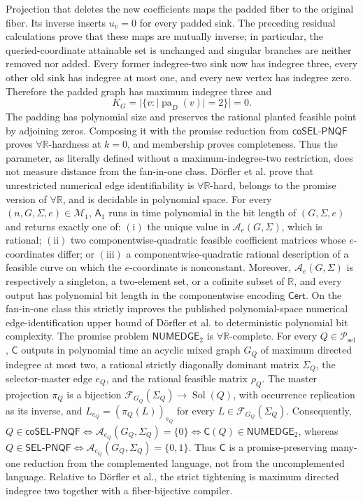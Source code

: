 Projection that deletes the new coefficients maps the padded fiber to the original fiber.  Its inverse inserts \(u_v=0\) for every padded sink.  The preceding residual calculations prove that these maps are mutually inverse; in particular, the queried-coordinate attainable set is unchanged and singular branches are neither removed nor added.  Every former indegree-two sink now has indegree three, every other old sink has indegree at most one, and every new vertex has indegree zero.  Therefore the padded graph has maximum indegree three and
\[
K_G=|\{v:|\operatorname{pa}_D(v)|=2\}|=0.
\]
The padding has polynomial size and preserves the rational planted feasible point by adjoining zeros.  Composing it with the promise reduction from \(\mathsf{coSEL\mbox{-}PNQF}\) proves \(\forall\mathbb R\)-hardness at \(k=0\), and membership proves completeness.  Thus the parameter, as literally defined without a maximum-indegree-two restriction, does not measure distance from the fan-in-one class.
Dörfler et al. prove that unrestricted numerical edge identifiability is \(\forall\mathbb R\)-hard, belongs to the promise version of \(\forall\mathbb R\), and is decidable in polynomial space.
For every \((n,G,\Sigma,e)\in\mathcal M_1\), \(\mathsf A_1\) runs in time polynomial in the bit length of \((G,\Sigma,e)\) and returns exactly one of: \(\mathrm{(i)}\) the unique value in \(\mathcal A_e(G,\Sigma)\), which is rational; \(\mathrm{(ii)}\) two componentwise-quadratic feasible coefficient matrices whose \(e\)-coordinates differ; or \(\mathrm{(iii)}\) a componentwise-quadratic rational description of a feasible curve on which the \(e\)-coordinate is nonconstant. Moreover, \(\mathcal A_e(G,\Sigma)\) is respectively a singleton, a two-element set, or a cofinite subset of \(\mathbb R\), and every output has polynomial bit length in the componentwise encoding \(\mathsf{Cert}\). On the fan-in-one class this strictly improves the published polynomial-space numerical edge-identification upper bound of Dörfler et al. to deterministic polynomial bit complexity.
The promise problem \(\mathsf{NUMEDGE}_2\) is \(\forall\mathbb R\)-complete. For every \(Q\in\mathcal P_{\mathrm{sel}}\), \(\mathsf C\) outputs in polynomial time an acyclic mixed graph \(G_Q\) of maximum directed indegree at most two, a rational strictly diagonally dominant matrix \(\Sigma_Q\), the selector-master edge \(e_Q\), and the rational feasible matrix \(\rho_Q\). The master projection \(\pi_Q\) is a bijection \(\mathcal F_{G_Q}(\Sigma_Q)\to\operatorname{Sol}(Q)\), with occurrence replication as its inverse, and \(L_{e_Q}=(\pi_Q(L))_{s_Q}\) for every \(L\in\mathcal F_{G_Q}(\Sigma_Q)\). Consequently, \(Q\in\mathsf{coSEL\mbox{-}PNQF}\Longleftrightarrow\mathcal A_{e_Q}(G_Q,\Sigma_Q)=\{0\}\Longleftrightarrow\mathsf C(Q)\in\mathsf{NUMEDGE}_2\), whereas \(Q\in\mathsf{SEL\mbox{-}PNQF}\Longleftrightarrow\mathcal A_{e_Q}(G_Q,\Sigma_Q)=\{0,1\}\). Thus \(\mathsf C\) is a promise-preserving many-one reduction from the complemented language, not from the uncomplemented language. Relative to Dörfler et al., the strict tightening is maximum directed indegree two together with a fiber-bijective compiler.

